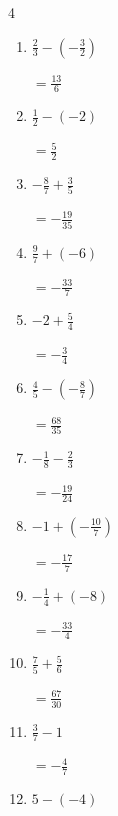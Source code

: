 \begin{multicols}{4}
\begin{enumerate}
        $\displaystyle =-\frac{7}{5}$

\columnbreak %

  \item $\displaystyle \frac{2}{3} - \left(-\frac{3}{2}\right)$

        $\displaystyle =\frac{13}{6}$

  \item $\displaystyle \frac{1}{2} - \left(-2\right)$

        $\displaystyle =\frac{5}{2}$

  \item $\displaystyle -\frac{8}{7} + \frac{3}{5}$

        $\displaystyle =-\frac{19}{35}$

  \item $\displaystyle \frac{9}{7} + \left(-6\right)$

        $\displaystyle =-\frac{33}{7}$

  \item $\displaystyle -2 + \frac{5}{4}$

        $\displaystyle =-\frac{3}{4}$

  \item $\displaystyle \frac{4}{5} - \left(-\frac{8}{7}\right)$

        $\displaystyle =\frac{68}{35}$

  \item $\displaystyle -\frac{1}{8} - \frac{2}{3}$

        $\displaystyle =-\frac{19}{24}$

  \item $\displaystyle -1 + \left(-\frac{10}{7}\right)$

        $\displaystyle =-\frac{17}{7}$

  \item $\displaystyle -\frac{1}{4} + \left(-8\right)$

        $\displaystyle =-\frac{33}{4}$

  \item $\displaystyle \frac{7}{5} + \frac{5}{6}$

        $\displaystyle =\frac{67}{30}$

\columnbreak %

\resetques

  \item $\displaystyle \frac{3}{7} - 1$

        $\displaystyle =-\frac{4}{7}$

  \item $\displaystyle 5 - \left(-4\right)$


\end{enumerate}
\end{multicols}
